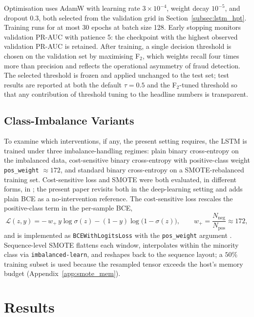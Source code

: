 \documentclass[oneside,12pt,parskip=half,american,numbers=noenddot]{scrreprt}
\begin{document}
Optimisation uses AdamW with learning rate $3\times 10^{-4}$, weight decay $10^{-5}$, and dropout $0.3$, both selected from the validation grid in Section~\ref{subsec:lstm_hpt}. Training runs for at most 30 epochs at batch size 128. Early stopping monitors validation PR-AUC with patience 5: the checkpoint with the highest observed validation PR-AUC is retained. After training, a single decision threshold is chosen on the validation set by maximising F\(_2\), which weights recall four times more than precision and reflects the operational asymmetry of fraud detection. The selected threshold is frozen and applied unchanged to the test set; test results are reported at both the default $\tau = 0.5$ and the F\(_2\)-tuned threshold so that any contribution of threshold tuning to the headline numbers is transparent.

\section{Class-Imbalance Variants}
\label{sec:imbalance}

To examine which interventions, if any, the present setting requires, the LSTM is trained under three imbalance-handling regimes: plain binary cross-entropy on the imbalanced data, cost-sensitive binary cross-entropy with positive-class weight \texttt{pos\_weight} $\approx 172$, and standard binary cross-entropy on a SMOTE-rebalanced training set. Cost-sensitive loss and SMOTE were both evaluated, in different forms, in \textcite{Du2026MLFraud}; the present paper revisits both in the deep-learning setting and adds plain BCE as a no-intervention reference. The cost-sensitive loss rescales the positive-class term in the per-sample BCE,
\begin{equation}
\mathcal{L}(z, y) = -\,w_{+}\, y \log \sigma(z) - (1 - y) \log\!\bigl(1 - \sigma(z)\bigr),
\qquad w_{+} = \frac{N_{\text{neg}}}{N_{\text{pos}}} \approx 172,
\end{equation}
and is implemented as \texttt{BCEWithLogitsLoss} with the \texttt{pos\_weight} argument \parencite{chawla_smote_2002}. Sequence-level SMOTE flattens each window, interpolates within the minority class via \texttt{imbalanced-learn}, and reshapes back to the sequence layout; a $50\%$ training subset is used because the resampled tensor exceeds the host's memory budget (Appendix~\ref{app:smote_mem}).


\pagebreak
\chapter{Results}\label{ch:results}
\end{document}
